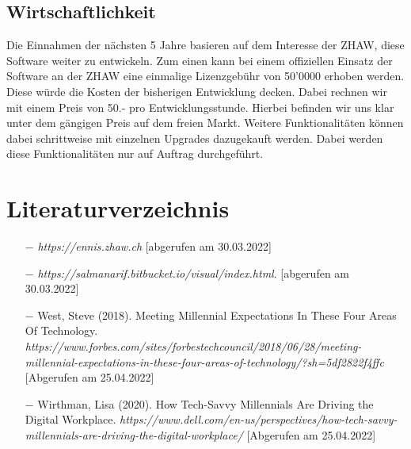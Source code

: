 \documentclass[10pt]{article}
\begin{document}
\subsection{Wirtschaftlichkeit}
Die Einnahmen der nächsten 5 Jahre basieren auf dem Interesse der ZHAW, diese Software weiter zu entwickeln. Zum einen kann bei einem offiziellen Einsatz der Software an der ZHAW eine einmalige Lizenzgebühr von 50'0000 erhoben werden. Diese würde die Kosten der bisherigen Entwicklung decken. Dabei rechnen wir mit einem Preis von 50.- pro Entwicklungsstunde. Hierbei befinden wir uns klar unter dem gängigen Preis auf dem freien Markt. Weitere Funktionalitäten können dabei schrittweise mit einzelnen Upgrades dazugekauft werden. Dabei werden diese Funktionalitäten nur auf Auftrag durchgeführt.

\section{Literaturverzeichnis}

\begin{itemize}

\item[$-$] \emph{https://ennis.zhaw.ch} [abgerufen am 30.03.2022]
\item[$-$] \emph{https://salmanarif.bitbucket.io/visual/index.html}. [abgerufen am 30.03.2022]
\item[$-$] West, Steve (2018). Meeting Millennial Expectations In These Four Areas Of Technology. \emph{https://www.forbes.com/sites/forbestechcouncil/2018/06/28/meeting-millennial-expectations-in-these-four-areas-of-technology/?sh=5df2822f4ffc} [Abgerufen am 25.04.2022]
\item[$-$] Wirthman, Lisa (2020). How Tech-Savvy Millennials Are Driving the Digital Workplace. \emph{https://www.dell.com/en-us/perspectives/how-tech-savvy-millennials-are-driving-the-digital-workplace/} [Abgerufen am 25.04.2022]

\end{itemize}
\end{document}
